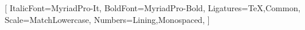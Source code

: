 \setsansfont{MyriadPro}
		[
			ItalicFont={MyriadPro-It},
			BoldFont={MyriadPro-Bold},
			Ligatures={TeX,Common},
			Scale=MatchLowercase,
			Numbers={Lining,Monospaced},
		]